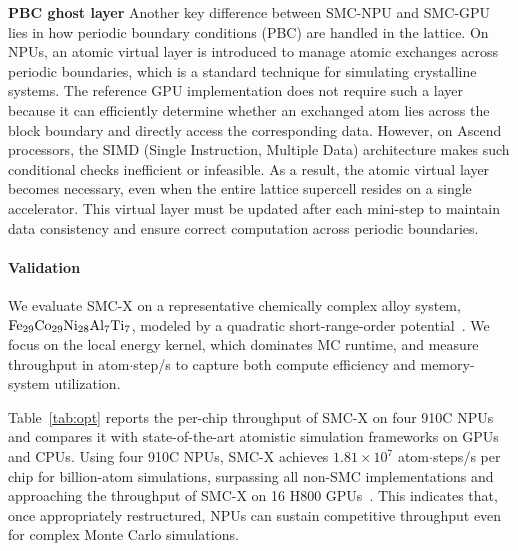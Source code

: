 \documentclass{article}
\begin{document}
\textbf{PBC ghost layer}
Another key difference between SMC-NPU and SMC-GPU lies in how periodic boundary conditions (PBC) are handled in the lattice. On NPUs, an atomic virtual layer is introduced to manage atomic exchanges across periodic boundaries, which is a standard technique for simulating crystalline systems. The reference GPU implementation does not require such a layer because it can efficiently determine whether an exchanged atom lies across the block boundary and directly access the corresponding data.
However, on Ascend processors, the SIMD (Single Instruction, Multiple Data) architecture makes such conditional checks inefficient or infeasible. As a result, the atomic virtual layer becomes necessary, even when the entire lattice supercell resides on a single accelerator. This virtual layer must be updated after each mini-step to maintain data consistency and ensure correct computation across periodic boundaries.

\paragraph{Validation}
We evaluate SMC-X on a representative chemically complex alloy system, $\rm{Fe_{29}Co_{29}Ni_{28}Al_7Ti_7}$, modeled by a quadratic short-range-order potential~\cite{LIU2023101018, MatterHEAQuantum}. We focus on the local energy kernel, which dominates MC runtime, and measure throughput in atom$\cdot$step/s to capture both compute efficiency and memory-system utilization.

Table~\ref{tab:opt} reports the per-chip throughput of SMC-X on four 910C NPUs and compares it with state-of-the-art atomistic simulation frameworks on GPUs and CPUs. Using four 910C NPUs, SMC-X achieves $1.81 \times 10^7$ atom$\cdot$steps/s per chip for billion-atom simulations, surpassing all non-SMC implementations and approaching the throughput of SMC-X on 16 H800 GPUs~\cite{doi:10.1021/acs.jctc.5c01614}. This indicates that, once appropriately restructured, NPUs can sustain competitive throughput even for complex Monte Carlo simulations.
\end{document}
